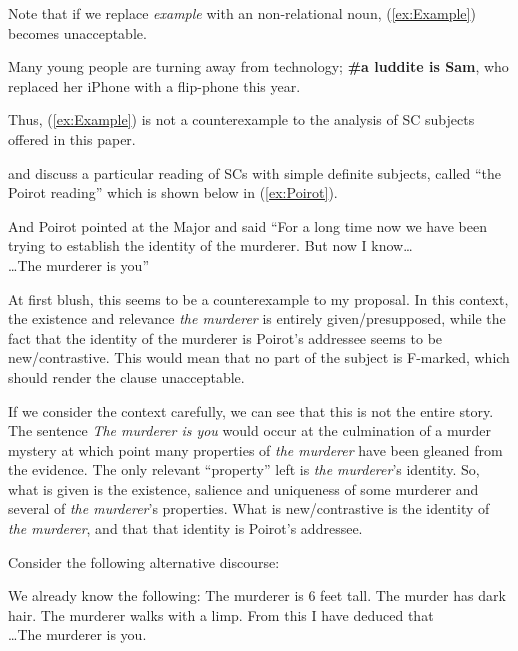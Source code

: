 \documentclass[
	letterpaper,
]{article}
\begin{document}
Note that if we replace \textit{example} with an non-relational noun, (\ref{ex:Example}) becomes unacceptable.
\begin{exe}
	\ex\label{ex:Luddite} Many young people are turning away from technology; \textbf{\#a luddite is Sam}, who replaced her iPhone with a flip-phone this year.
\end{exe}
Thus, (\ref{ex:Example}) is not a counterexample to the analysis of SC subjects offered in this paper.


\textcite{heycock2010variability} and \textcite{bejarkahnemuyipour2013agreement} discuss a particular reading of SCs with simple definite subjects, called ``the Poirot reading'' which is shown below in (\ref{ex:Poirot}).
\begin{exe}
	\ex\label{ex:Poirot} And Poirot pointed at the Major and said ``For a long time now we have been trying to establish the identity of the murderer. But now I know\ldots\\
	\ldots The murderer is you''
\end{exe}

At first blush, this seems to be a counterexample to my proposal.
In this context, the existence and relevance \textit{the murderer} is entirely given/presupposed, while the fact that the identity of the murderer is Poirot's addressee seems to be new/contrastive. 
This would mean that no part of the subject is F-marked, which should render the clause unacceptable.

If we consider the context carefully, we can see that this is not the entire story.
The sentence \textit{The murderer is you} would occur at the culmination of a murder mystery at which point many properties of \textit{the murderer} have been gleaned from the evidence.
The only relevant ``property'' left is \textit{the murderer}'s identity.
So, what is given is the existence, salience and uniqueness of  some murderer and several of \textit{the murderer}'s properties.
What is new/contrastive is the identity of \textit{the murderer}, and that that identity is Poirot's addressee.

Consider the following alternative discourse:
\begin{exe}
	\ex\label{ex:Poirot2} We already know the following: The murderer is 6 feet tall. The murder has dark hair. The murderer walks with a limp. From this I have deduced that \\
\ldots The murderer is you.
\end{exe}
\end{document}
